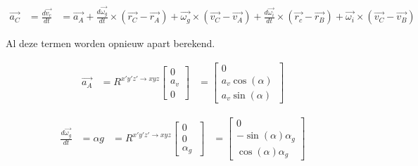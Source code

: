\begin{equation*}
\begin{split}
\overrightarrow{a_{C}}&=\frac{d\overrightarrow{v_{c}}}{dt}
&=	\overrightarrow{a_{A}} + \frac{d\overrightarrow{\omega_{g}}}{dt}\times(\overrightarrow{r_{C}}-\overrightarrow{r_{A}}) + \overrightarrow{\omega_{g}}\times(\overrightarrow{v_{C}}-\overrightarrow{v_{A}}) + \frac{d\overrightarrow{\omega_i}}{dt}\times(\overrightarrow{r_{c}}-\overrightarrow{r_{B}})+\overrightarrow{\omega_{i}}\times(\overrightarrow{v_{C}}-\overrightarrow{v_{B}})
\end{split}
\end{equation*}

Al deze termen worden opnieuw apart berekend.

\begin{equation*}
\begin{split}
\overrightarrow{a_{A}}
&=R^{x'y'z' \rightarrow xyz}
	\begin{bmatrix}
	0\\
	a_v\\
	0
	\end{bmatrix}
&=	\begin{bmatrix}
	0\\
	a_v\cos(\alpha)\\
	a_v\sin(\alpha)\
	\end{bmatrix}
\end{split}
\end{equation*}

\begin{equation*}
\begin{split}
\frac{d\overrightarrow{\omega_g}}{dt}&=\alpha{g}
&=	R^{x'y'z' \rightarrow xyz}
	\begin{bmatrix}
	0\\
	0\\
	\alpha_{g}\
	\end{bmatrix}
&=	\begin{bmatrix}
	0\\
	-\sin(\alpha)\alpha_{g}\\
	\cos(\alpha)\alpha_{g}\
	\end{bmatrix}
\end{split}
\end{equation*}


